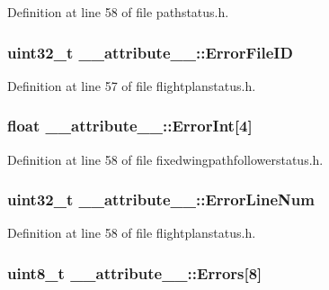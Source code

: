 \-Definition at line 58 of file pathstatus.\-h.

\hypertarget{struct____attribute_____a3143008071e810ddc27303e896a8abe7}{
\subsubsection[{\-Error\-File\-I\-D}]{\setlength{\rightskip}{0pt plus 5cm}uint32\-\_\-t {\bf \-\_\-\-\_\-attribute\-\_\-\-\_\-\-::\-Error\-File\-I\-D}}}\label{struct____attribute_____a3143008071e810ddc27303e896a8abe7}


\-Definition at line 57 of file flightplanstatus.\-h.

\hypertarget{struct____attribute_____a8dc8601de361687ca85d021c9a864c6d}{
\subsubsection[{\-Error\-Int}]{\setlength{\rightskip}{0pt plus 5cm}float {\bf \-\_\-\-\_\-attribute\-\_\-\-\_\-\-::\-Error\-Int}\mbox{[}4\mbox{]}}}\label{struct____attribute_____a8dc8601de361687ca85d021c9a864c6d}


\-Definition at line 58 of file fixedwingpathfollowerstatus.\-h.

\hypertarget{struct____attribute_____a3cd25b7227bd8045a334d6491d90c5ce}{
\subsubsection[{\-Error\-Line\-Num}]{\setlength{\rightskip}{0pt plus 5cm}uint32\-\_\-t {\bf \-\_\-\-\_\-attribute\-\_\-\-\_\-\-::\-Error\-Line\-Num}}}\label{struct____attribute_____a3cd25b7227bd8045a334d6491d90c5ce}


\-Definition at line 58 of file flightplanstatus.\-h.

\hypertarget{struct____attribute_____a4d96fdf6b010d6be51941e4a7d3368e0}{
\subsubsection[{\-Errors}]{\setlength{\rightskip}{0pt plus 5cm}uint8\-\_\-t {\bf \-\_\-\-\_\-attribute\-\_\-\-\_\-\-::\-Errors}\mbox{[}8\mbox{]}}}\label{struct____attribute_____a4d96fdf6b010d6be51941e4a7d3368e0}


